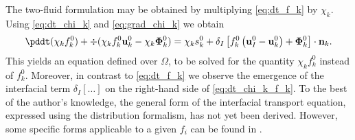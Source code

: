 \documentclass[12pt,a4paper]{article}
\begin{document}
The two-fluid formulation may be obtained by multiplying \ref{eq:dt_f_k} by $\chi_k$. 
Using \ref{eq:dt_chi_k} and \ref{eq:grad_chi_k} we obtain
\begin{equation}
    \pddt (\chi_k f_k^0)
    + \div (
        \chi_k f_k^0 \textbf{u}_k^0
        - \chi_k \mathbf{\Phi}_k^0 
        )
    = 
    \chi_k s_k^0
    + \delta_I\left[
        f_k^0
        \left(
            \textbf{u}_I^0
            - \textbf{u}_k^0
        \right)
        + \mathbf{\Phi}_k^0
    \right]
    \cdot \textbf{n}_k.
    \label{eq:dt_chi_k_f_k}
\end{equation}
This yields an equation defined over $\Omega$, to be solved for the quantity $\chi_k f_k^0$ instead of $f_k^0$. 
Moreover, in contrast to \ref{eq:dt_f_k} we observe the emergence of the interfacial term $ \delta_I[\ldots]$ on the right-hand side of \ref{eq:dt_chi_k_f_k}. 
To the best of the author's knowledge, the general form of the interfacial transport equation, expressed using the distribution formalism, has not yet been derived. However, some specific forms applicable to a given $f_i$ can be found in \citet{marle1982macroscopic, teigen2009}.



\\


\end{document}

